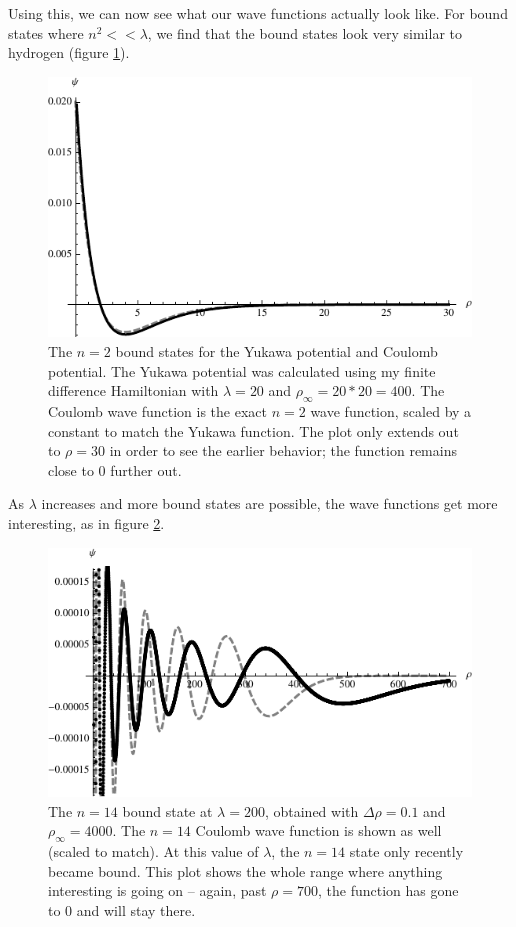 \documentclass[12pt,twoside]{reedthesis}
\begin{document}
Using this, we can now see what our wave functions actually look like. For bound states where $n^2 << \lambda$, we find that the bound states look very similar to hydrogen (figure \ref{fig:hyd-yukawa}).
\begin{figure}[h]
\centering
\includegraphics{Figures/n2hydyukawa}
\caption[The $n = 2$ bound states for the Yukawa potential and Coulomb potential]{The $n = 2$ bound states for the Yukawa potential and Coulomb potential. The Yukawa potential was calculated using my finite difference Hamiltonian with $\lambda = 20$ and  $\rho_{\infty} = 20*20 = 400$. The Coulomb wave function is the exact $n=2$ wave function, scaled by a constant to match the Yukawa function. The plot only extends out to $\rho = 30$ in order to see the earlier behavior; the function remains close to 0 further out.}
\label{fig:hyd-yukawa}
\end{figure}
As $\lambda$ increases and more bound states are possible, the wave functions get more interesting, as in figure \ref{fig:largebound}.
\begin{figure}[h!]
\centering
\includegraphics{Figures/largebound}
\caption[The $n=14$ bound state at $\lambda = 200$]{The $n=14$ bound state at $\lambda = 200$, obtained with $\Delta \rho = 0.1$ and $\rho_{\infty} = 4000$. The $n=14$ Coulomb wave function is shown as well (scaled to match). At this value of $\lambda$, the $n=14$ state only recently became bound. This plot shows the whole range where anything interesting is going on -- again, past $\rho = 700$, the function has gone to 0 and will stay there.}
\label{fig:largebound}
\end{figure}
\end{document}
